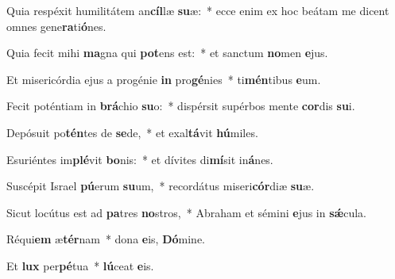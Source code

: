 \item Quia respéxit humilitátem an\textbf{cíl}læ \textbf{su}æ:~* ecce enim ex hoc beátam me dicent omnes gene\textbf{ra}ti\textbf{ó}nes.
\item Quia fecit mihi \textbf{ma}gna qui \textbf{pot}ens est:~* et sanctum \textbf{no}men \textbf{e}jus.
\item Et misericórdia ejus a progénie \textbf{in} pro\textbf{gé}nies~* ti\textbf{mén}tibus \textbf{e}um.
\item Fecit poténtiam in \textbf{brá}chio \textbf{su}o:~* dispérsit supérbos mente \textbf{cor}dis \textbf{su}i.
\item Depósuit po\textbf{tén}tes de \textbf{se}de,~* et exal\textbf{tá}vit \textbf{hú}miles.
\item Esuriéntes im\textbf{plé}vit \textbf{bo}nis:~* et dívites di\textbf{mí}sit in\textbf{á}nes.
\item Suscépit Israel \textbf{pú}erum \textbf{su}um,~* recordátus miseri\textbf{cór}diæ \textbf{su}æ.
\item Sicut locútus est ad \textbf{pa}tres \textbf{no}stros,~* Abraham et sémini \textbf{e}jus in \textbf{sǽ}cula.
\item Réqui\textbf{em} æ\textbf{tér}nam~* dona \textbf{e}is, \textbf{Dó}mine.
\item Et \textbf{lux} per\textbf{pé}tua~* \textbf{lú}ceat \textbf{e}is.
